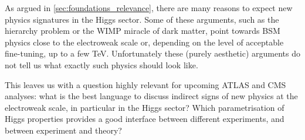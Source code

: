 

As argued in \autoref{sec:foundations_relevance}, there are many
reasons to expect new physics signatures in the Higgs sector. Some of
these arguments, such as the hierarchy problem or the WIMP miracle of
dark matter, point towards BSM physics close to the electroweak scale
or, depending on the level of acceptable fine-tuning, up to a few
TeV. Unfortunately these (purely aesthetic) arguments do not tell us
what exactly such physics should look like.

This leaves us with a question highly relevant for upcoming ATLAS and
CMS analyses: what is the best language to discuss indirect signs of
new physics at the electroweak scale, in particular in the Higgs
sector? Which parametrisation of Higgs properties provides a good
interface between different experiments, and between experiment and
theory?

